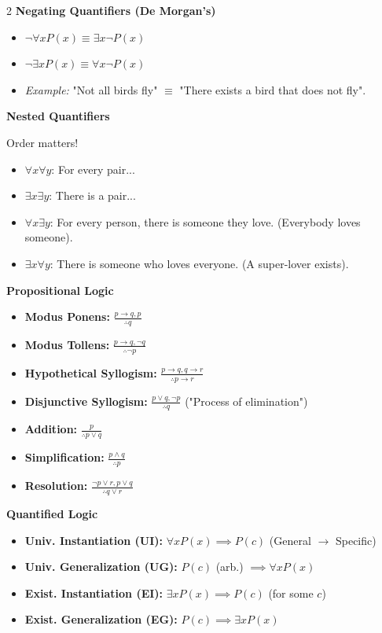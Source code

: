 \documentclass[11pt,letterpaper]{article}
\newcommand{\mysection}[1]{%
    \vspace{-0.3em}
    \colorbox{sectioncolor}{\makebox[\linewidth][l]{\bfseries\color{white}#1}}%
    \vspace{0.3em}
}
\newcommand{\mysubsection}[1]{%
    \vspace{-0.2em}
    {\bfseries\color{sectioncolor}#1}%
    \vspace{0.1em}
}
\begin{document}
\begin{multicols*}{2}
\mysubsection{Negating Quantifiers (De Morgan's)}
\begin{itemize}[leftmargin=*, noitemsep, topsep=0pt]
    \item $\neg \forall x P(x) \equiv \exists x \neg P(x)$
    \item $\neg \exists x P(x) \equiv \forall x \neg P(x)$
    \item \textit{Example:} "Not all birds fly" $\equiv$ "There exists a bird that does not fly".
\end{itemize}

\mysubsection{Nested Quantifiers}
Order matters!
\begin{itemize}[leftmargin=*, noitemsep, topsep=0pt]
    \item $\forall x \forall y$: For every pair...
    \item $\exists x \exists y$: There is a pair...
    \item $\forall x \exists y$: For every person, there is someone they love. (Everybody loves someone).
    \item $\exists x \forall y$: There is someone who loves everyone. (A super-lover exists).
\end{itemize}

\mysection{4. Rules of Inference}

\mysubsection{Propositional Logic}
\begin{itemize}[leftmargin=*, noitemsep, topsep=0pt]
    \item \textbf{Modus Ponens:} $\frac{p \to q, p}{\therefore q}$
    \item \textbf{Modus Tollens:} $\frac{p \to q, \neg q}{\therefore \neg p}$
    \item \textbf{Hypothetical Syllogism:} $\frac{p \to q, q \to r}{\therefore p \to r}$
    \item \textbf{Disjunctive Syllogism:} $\frac{p \lor q, \neg p}{\therefore q}$ ("Process of elimination")
    \item \textbf{Addition:} $\frac{p}{\therefore p \lor q}$
    \item \textbf{Simplification:} $\frac{p \land q}{\therefore p}$
    \item \textbf{Resolution:} $\frac{\neg p \lor r, p \lor q}{\therefore q \lor r}$
\end{itemize}

\mysubsection{Quantified Logic}
\begin{itemize}[leftmargin=*, noitemsep, topsep=0pt]
    \item \textbf{Univ. Instantiation (UI):} $\forall x P(x) \implies P(c)$ (General $\to$ Specific)
    \item \textbf{Univ. Generalization (UG):} $P(c)$ (arb.) $\implies \forall x P(x)$
    \item \textbf{Exist. Instantiation (EI):} $\exists x P(x) \implies P(c)$ (for some $c$)
    \item \textbf{Exist. Generalization (EG):} $P(c) \implies \exists x P(x)$
\end{itemize}


\end{multicols*}
\end{document}
